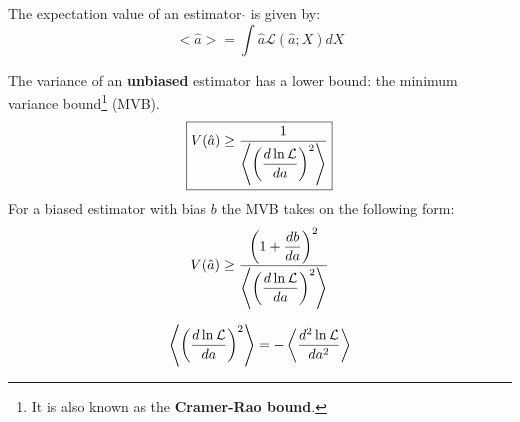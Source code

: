 {	
    
	\begin{property}
    		The expectation value of an estimator $\hat{}$ is given by:
        	\begin{equation}
			<\hat{a}> = \int \hat{a}\mathcal{L}(\hat{a};X)dX
		\end{equation}
	\end{property}

	\begin{theorem}
	    	The variance of an \textbf{unbiased} estimator has a lower bound: the minimum variance bound\footnote{It is also known as the \textbf{Cramer-Rao bound}.} (MVB).
		\begin{equation}
			\label{statistics:theorem:minimum_variance_bound}
		        \boxed{V(\hat{a})\geq\stylefrac{1}{\left<\left(\deriv{\ln\mathcal{L}}{a}\right)^2\right>}}
		\end{equation}
	        For a biased estimator with bias $b$ the MVB takes on the following form:
        	\begin{equation}
			\label{statistics:theorem:biased_minimum_variance_bound}
        		V(\hat{a})\geq\stylefrac{\left(1+\deriv{b}{a}\right)^2}{\left<\left(\deriv{\ln\mathcal{L}}{a}\right)^2\right>}
		\end{equation}
	\end{theorem}
	\begin{remark}
	    	\begin{equation}
			\left<\left(\frac{d\ln\mathcal{L}}{da}\right)^2\right> = -\left<\frac{d^{2} \ln\mathcal{L}}{d a ^{2}}\right>
		\end{equation}
	\end{remark}

    
}
